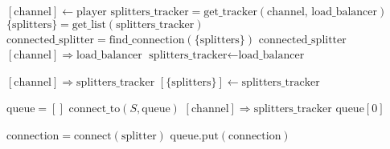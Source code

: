 \documentclass{article}
\begin{document}
\pagestyle{empty}

\newcommand{\send}{\Rightarrow}
\newcommand{\sendto}{\rightarrow}
\algrenewcommand{}
\algrenewcommand\textproc{\textrm}

\begin{algorithmic}

  
  \State $[\text{channel}] \gets \text{player}$
  \State $\text{splitters\_tracker} = \text{get\_tracker}(\text{channel, load\_balancer})$
  \State $\{\text{splitters}\} = \text{get\_list}(\text{splitters\_tracker})$
  \State $\text{connected\_splitter} = \text{find\_connection}(\{\text{splitters}\})$
  \State \Return $\text{connected\_splitter}$
  \EndFunction
  \State $[\text{channel}] \send \text{load\_balancer}$
  \State \Return $\text{splitters\_tracker} \gets \text{load\_balancer}$
  \EndFunction
  
  \State $[\text{channel}] \send \text{splitters\_tracker}$
  \State \Return $[\{\mathrm{splitters}\}] \gets \mathrm{splitters\_tracker}$
  \EndFunction

  \State $\mathrm{queue}=[]$
  \State $\text{connect\_to}(S, \text{queue})$
  \EndFor 
  \State $[\text{channel}] \send \text{splitters\_tracker}$
  \State \Return $\mathrm{queue}[0]$
  \EndFunction

  \algrenewcommand{}

  \State $\text{connection} = \mathrm{connect}(\text{splitter})$
  \State $\text{queue}.\text{put}(\text{connection})$
  \EndIf
  \EndFunction

  \EndProcedure

\end{algorithmic}
\end{document}

